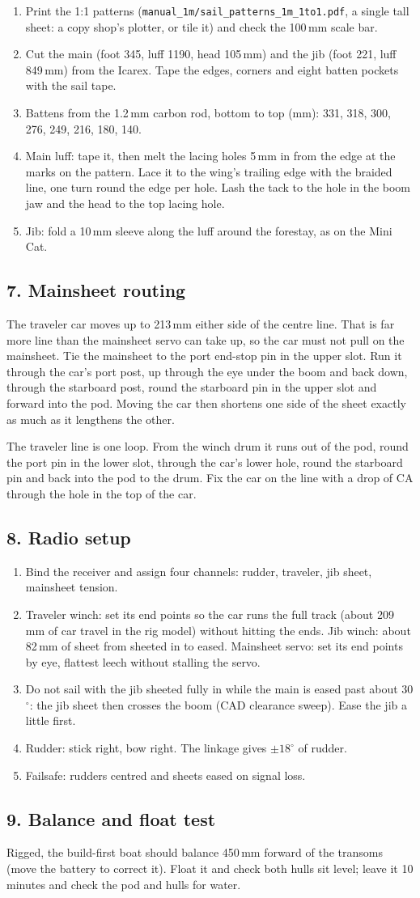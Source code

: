 \documentclass[11pt]{article}
\newcommand{\step}[1]{\subsection*{#1}}
\begin{document}
\begin{enumerate}
\item Print the 1:1 patterns (\texttt{manual\_1m/sail\_patterns\_1m\_1to1.pdf}, a single tall sheet: a copy shop's plotter, or tile it) and check the 100\,mm scale bar.
\item Cut the main (foot 345, luff 1190, head 105\,mm) and the jib (foot 221, luff 849\,mm) from the Icarex. Tape the edges, corners and eight batten pockets with the sail tape.
\item Battens from the 1.2\,mm carbon rod, bottom to top (mm): 331, 318, 300, 276, 249, 216, 180, 140.
\item Main luff: tape it, then melt the lacing holes 5\,mm in from the edge at the marks on the pattern. Lace it to the wing's trailing edge with the braided line, one turn round the edge per hole. Lash the tack to the hole in the boom jaw and the head to the top lacing hole.
\item Jib: fold a 10\,mm sleeve along the luff around the forestay, as on the Mini Cat.
\end{enumerate}
\step{7. Mainsheet routing}
The traveler car moves up to 213\,mm either side of the centre line. That is far more line than the mainsheet servo can take up, so the car must not pull on the mainsheet. Tie the mainsheet to the port end-stop pin in the upper slot. Run it through the car's port post, up through the eye under the boom and back down, through the starboard post, round the starboard pin in the upper slot and forward into the pod. Moving the car then shortens one side of the sheet exactly as much as it lengthens the other.

The traveler line is one loop. From the winch drum it runs out of the pod, round the port pin in the lower slot, through the car's lower hole, round the starboard pin and back into the pod to the drum. Fix the car on the line with a drop of CA through the hole in the top of the car.
\step{8. Radio setup}
\begin{enumerate}
\item Bind the receiver and assign four channels: rudder, traveler, jib sheet, mainsheet tension.
\item Traveler winch: set its end points so the car runs the full track (about 209\,mm of car travel in the rig model) without hitting the ends. Jib winch: about 82\,mm of sheet from sheeted in to eased. Mainsheet servo: set its end points by eye, flattest leech without stalling the servo.
\item Do not sail with the jib sheeted fully in while the main is eased past about 30$^\circ$: the jib sheet then crosses the boom (CAD clearance sweep). Ease the jib a little first.
\item Rudder: stick right, bow right. The linkage gives $\pm18^\circ$ of rudder.
\item Failsafe: rudders centred and sheets eased on signal loss.
\end{enumerate}
\step{9. Balance and float test}
Rigged, the build-first boat should balance 450\,mm forward of the transoms (move the battery to correct it). Float it and check both hulls sit level; leave it 10 minutes and check the pod and hulls for water.
\end{document}
